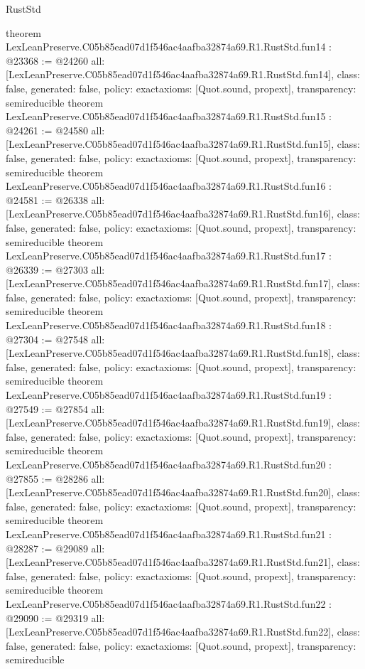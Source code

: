 \begin{lexlean}{RustStd}
\begin{coremodule}
{}
theorem LexLeanPreserve.C05b85ead07d1f546ac4aafba32874a69.R1.RustStd.fun14 : @23368 := @24260 {
  all: [LexLeanPreserve.C05b85ead07d1f546ac4aafba32874a69.R1.RustStd.fun14],
  class: false,
  generated: false,
  policy: exact{axioms: [Quot.sound, propext]},
  transparency: semireducible
}
theorem LexLeanPreserve.C05b85ead07d1f546ac4aafba32874a69.R1.RustStd.fun15 : @24261 := @24580 {
  all: [LexLeanPreserve.C05b85ead07d1f546ac4aafba32874a69.R1.RustStd.fun15],
  class: false,
  generated: false,
  policy: exact{axioms: [Quot.sound, propext]},
  transparency: semireducible
}
theorem LexLeanPreserve.C05b85ead07d1f546ac4aafba32874a69.R1.RustStd.fun16 : @24581 := @26338 {
  all: [LexLeanPreserve.C05b85ead07d1f546ac4aafba32874a69.R1.RustStd.fun16],
  class: false,
  generated: false,
  policy: exact{axioms: [Quot.sound, propext]},
  transparency: semireducible
}
theorem LexLeanPreserve.C05b85ead07d1f546ac4aafba32874a69.R1.RustStd.fun17 : @26339 := @27303 {
  all: [LexLeanPreserve.C05b85ead07d1f546ac4aafba32874a69.R1.RustStd.fun17],
  class: false,
  generated: false,
  policy: exact{axioms: [Quot.sound, propext]},
  transparency: semireducible
}
theorem LexLeanPreserve.C05b85ead07d1f546ac4aafba32874a69.R1.RustStd.fun18 : @27304 := @27548 {
  all: [LexLeanPreserve.C05b85ead07d1f546ac4aafba32874a69.R1.RustStd.fun18],
  class: false,
  generated: false,
  policy: exact{axioms: [Quot.sound, propext]},
  transparency: semireducible
}
theorem LexLeanPreserve.C05b85ead07d1f546ac4aafba32874a69.R1.RustStd.fun19 : @27549 := @27854 {
  all: [LexLeanPreserve.C05b85ead07d1f546ac4aafba32874a69.R1.RustStd.fun19],
  class: false,
  generated: false,
  policy: exact{axioms: [Quot.sound, propext]},
  transparency: semireducible
}
theorem LexLeanPreserve.C05b85ead07d1f546ac4aafba32874a69.R1.RustStd.fun20 : @27855 := @28286 {
  all: [LexLeanPreserve.C05b85ead07d1f546ac4aafba32874a69.R1.RustStd.fun20],
  class: false,
  generated: false,
  policy: exact{axioms: [Quot.sound, propext]},
  transparency: semireducible
}
theorem LexLeanPreserve.C05b85ead07d1f546ac4aafba32874a69.R1.RustStd.fun21 : @28287 := @29089 {
  all: [LexLeanPreserve.C05b85ead07d1f546ac4aafba32874a69.R1.RustStd.fun21],
  class: false,
  generated: false,
  policy: exact{axioms: [Quot.sound, propext]},
  transparency: semireducible
}
theorem LexLeanPreserve.C05b85ead07d1f546ac4aafba32874a69.R1.RustStd.fun22 : @29090 := @29319 {
  all: [LexLeanPreserve.C05b85ead07d1f546ac4aafba32874a69.R1.RustStd.fun22],
  class: false,
  generated: false,
  policy: exact{axioms: [Quot.sound, propext]},
  transparency: semireducible
}
\end{coremodule}
\end{lexlean}
